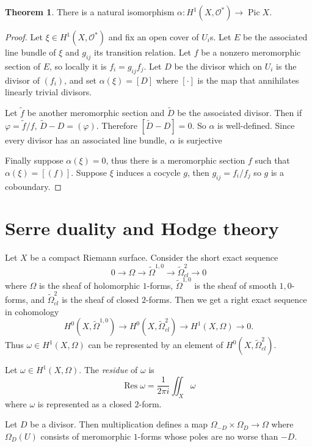 \documentclass[12pt]{book}
\newcommand{\Olo}{\mathscr O}
\DeclareMathOperator{\Pic}{Pic}
\DeclareMathOperator{\Res}{Res}
\newcommand{\dfn}[1]{\emph{#1}\index{#1}}
\theoremstyle{definition}
\newtheorem{theorem}{Theorem}[chapter]
\newenvironment{definition}
  {\pushQED{\qed}\renewcommand{\qedsymbol}{$\diamondsuit$}\definitionx}
  {\popQED\endexamplex}
\begin{document}
\begin{theorem}
There is a natural isomorphism $\alpha: H^1(X, \Olo^*) \to \Pic X$.
\end{theorem}
\begin{proof}
Let $\xi \in H^1(X, \Olo^*)$ and fix an open cover of $U_i$s.
Let $E$ be the associated line bundle of $\xi$ and $g_{ij}$ its transition relation.
Let $f$ be a nonzero meromorphic section of $E$, so locally it is $f_i = g_{ij}f_j$.
Let $D$ be the divisor which on $U_i$ is the divisor of $(f_i)$, and set $\alpha(\xi) = [D]$ where $[\cdot]$ is the map that annihilates linearly trivial divisors.

Let $\tilde f$ be another meromorphic section and $\tilde D$ be the associated divisor.
Then if $\varphi = \tilde f/f$, $\tilde D - D = (\varphi)$.
Therefore $[\tilde D - D] = 0$.
So $\alpha$ is well-defined.
Since every divisor has an associated line bundle, $\alpha$ is surjective

Finally suppose $\alpha(\xi) = 0$, thus there is a meromorphic section $f$ such that $\alpha(\xi) = [(f)]$.
Suppose $\xi$ induces a cocycle $g$, then $g_{ij} = f_i/f_j$ so $g$ is a coboundary.
\end{proof}

\section{Serre duality and Hodge theory}
Let $X$ be a compact Riemann surface.
Consider the short exact sequence
$$0 \to \Omega \to \tilde \Omega^{1,0} \to \tilde \Omega^2_{cl} \to 0$$
where $\Omega$ is the sheaf of holomorphic $1$-forms, $\tilde \Omega^{1,0}$ is the sheaf of smooth $1,0$-forms, and $\tilde \Omega^2_{cl}$ is the sheaf of closed $2$-forms.
Then we get a right exact sequence in cohomology
$$H^0(X, \tilde \Omega^{1,0}) \to H^0(X, \tilde \Omega^2_{cl}) \to H^1(X, \Omega) \to 0.$$
Thus $\omega \in H^1(X, \Omega)$ can be represented by an element of $H^0(X, \tilde \Omega^2_{cl})$.

\begin{definition}
Let $\omega \in H^1(X, \Omega)$. The \dfn{residue} of $\omega$ is
$$\Res \omega = \frac{1}{2\pi i} \iint_X \omega$$
where $\omega$ is represented as a closed $2$-form.
\end{definition}

Let $D$ be a divisor. Then multiplication defines a map $\Omega_{-D} \times \Omega_D \to \Omega$ where $\Omega_D(U)$ consists of meromorphic $1$-forms whose poles are no worse than $-D$.
\end{document}
